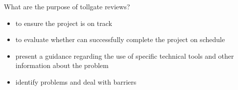 What are the purpose of tollgate reviews?

    \begin{itemize}
        \item to ensure the project is on track
            
        \item to evaluate whether can successfully complete the project on schedule
            
        \item present a guidance regarding the use of specific technical tools and other information about the problem
            
        \item identify problems and deal with barriers
    \end{itemize}